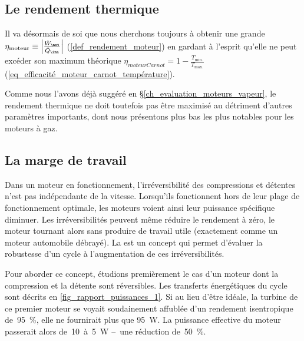 	\subsection{Le rendement thermique}

		Il va désormais de soi que nous cherchons toujours à obtenir une grande  $\eta_\text{moteur} \equiv \left| \frac{\dot{W}_\net}{\dot{Q}_\inn} \right|$ (\ref{def_rendement_moteur}) en gardant à l’esprit qu’elle ne peut excéder son maximum théorique $\eta _{moteur Carnot} = 1 - \frac{T_\text{min.}}{T_\text{max.}}$ (\ref{eq_efficacité_moteur_carnot_température}).

		Comme nous l’avons déjà suggéré en \S\ref{ch_evaluation_moteurs_vapeur}, le rendement thermique ne doit toutefois pas être maximisé au détriment d’autres paramètres importants, dont nous présentons plus bas les plus notables pour les moteurs à gaz.

	\subsection{La marge de travail}
	\label{ch_rapport_des_puissances}

		Dans un moteur en fonctionnement, l’irréversibilité des compressions et détentes n’est pas indépendante de la vitesse. Lorsqu’ils fonctionnent hors de leur plage de fonctionnement optimale, les moteurs voient ainsi leur puissance spécifique diminuer. Les irréversibilités peuvent même réduire le rendement à zéro, le moteur tournant alors sans produire de travail utile (exactement comme un moteur automobile débrayé). La  est un concept qui permet d’évaluer la robustesse d’un cycle à l’augmentation de ces irréversibilités.

		Pour aborder ce concept, étudions premièrement le cas d’un moteur dont la compression et la détente sont réversibles. Les transferts énergétiques du cycle sont décrits en \cref{fig_rapport_puissances_1}. Si au lieu d’être idéale, la turbine de ce premier moteur se voyait soudainement affublée d’un rendement isentropique de~\SI{95}{\percent}, elle ne fournirait plus que \SI{95}{\watt}. La puissance effective du moteur passerait alors de~\num{10}~à~\SI{5}{\watt} --\ une réduction de~\SI{50}{\percent}.

